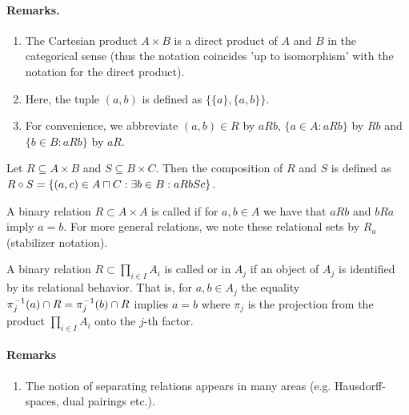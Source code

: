 \documentclass[8pt,a4paper]{article}
\begin{document}
\paragraph{Remarks.}
\begin{enumerate}
\item The Cartesian product $A\times B$ is a direct product of $A$ and $B$
in the categorical sense (thus the notation coincides 'up to
isomorphism' with the notation for the direct product).
\item Here, the
tuple $(a,b)$ is defined as $\{\{a\},\{a,b\}\}$.
\item For convenience, we abbreviate $(a,b)\in R$ by $aRb$, $\{a\in A:
  aRb\}$ by $Rb$ and $\{b\in B: aRb\}$ by $aR$.
\end{enumerate}

\begin{definition}
Let $R\subseteq A\times B$ and $S\subseteq B\times C$. Then the
composition of $R$ and $S$ is defined as $R\circ S = \{(a,c)\in
A\mathbin{\sqcap} C: \exists b\in B: aRbSc\}$.
\end{definition}

\begin{definition}[antisymmetric]
A binary relation $R\subset A\times A$ is called 
if for $a,b\in A$ we have that $aRb$ and $bRa$ imply $a=b$.
For more general relations, we note these relational sets by $R_a$
(stabilizer notation).
\end{definition}

\begin{definition}
A binary relation $R\subset \prod_{i\in I}{A_i}$ is called 
or  in $A_j$ if an object of $A_j$ is identified by its relational
behavior. That is, for $a,b\in A_j$ the equality
$\pi_j^{-1}(a)\cap R=\pi_j^{-1}(b)\cap R$ implies $a=b$
where $\pi_j$ is the projection from the product $\prod_{i\in
  I}{A_i}$ onto the $j$-th factor.
\end{definition}

\paragraph{Remarks}
\begin{enumerate}
\item The notion of separating relations appears in many areas
  (e.g. Hausdorff-spaces, dual pairings etc.).
\end{enumerate}
\end{document}
